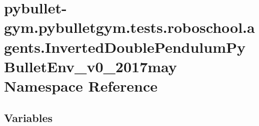 \hypertarget{namespacepybullet-gym_1_1pybulletgym_1_1tests_1_1roboschool_1_1agents_1_1_inverted_double_pendulum_py_bullet_env__v0__2017may}{}\section{pybullet-\/gym.pybulletgym.\+tests.\+roboschool.\+agents.\+Inverted\+Double\+Pendulum\+Py\+Bullet\+Env\+\_\+v0\+\_\+2017may Namespace Reference}
\label{namespacepybullet-gym_1_1pybulletgym_1_1tests_1_1roboschool_1_1agents_1_1_inverted_double_pendulum_py_bullet_env__v0__2017may}
\subsection*{Variables}
